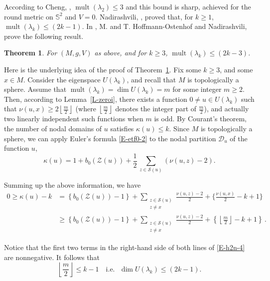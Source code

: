 \documentclass[12pt,a4paper]{amsart}
\theoremstyle{plain} %
\newtheorem{theorem}{Theorem}[section]
\theoremstyle{definition}
\numberwithin{equation}{section}
\numberwithin{figure}{section}
\numberwithin{table}{section}
\newcommand{\bS}{\mathbb{S}}
\newcommand{\cD}{\mathcal{D}}
\newcommand{\cS}{\mathcal{S}}
\newcommand{\cZ}{\mathcal{Z}}
\DeclareMathOperator{\mult}{mult}
\newcommand{\floor}[1]{\left\lfloor #1 \right\rfloor}
\begin{document}
According to  Cheng, \cite{Chen1976}, $\mult(\lambda_2) \le 3$ and this bound is sharp, achieved for the round metric on $\bS^2$ and $V=0$. Nadirashvili, \cite{Nadi1987}, proved that, for $ k \ge 1$, $\mult(\lambda_k) \le (2k-1)$. In \cite{HoHN1999}, M. and T. Hoffmann-Ostenhof and Nadirashvili, prove the following result.


\begin{theorem}\label{T-h2n}
For $(M,g,V)$ as above, and for $k \ge 3$, $\mult(\lambda_k) \le (2k-3)$.
\end{theorem}%

Here is the underlying idea of the proof of Theorem~\ref{T-h2n}.
Fix some $k \ge 3$, and some $x \in M$. Consider the eigenspace $U(\lambda_k)$, and recall that $M$ is topologically a sphere. \smallskip
Assume that $\mult(\lambda_k) = \dim U(\lambda_k) = m$ for some integer $m \ge 2$. Then, according to Lemma~\ref{L-zeroi}, there exists a function $0 \not = u \in U(\lambda_k)$ such that $\nu(u,x) \ge 2 \floor{\frac m2}$ (where $\floor{\frac m2}$ denotes the integer part of $\frac m2$), and actually two linearly independent such functions when $m$ is odd. By Courant's theorem, the number of nodal domains of $u$ satisfies $\kappa(u) \le k$. Since  $M$ is  topologically   a sphere, we can apply Euler's formula \eqref{E-etf0-2} to the nodal partition $\cD_{u}$ of the function $u$,
%
\begin{equation}\label{E-h2n-2}
\kappa(u) = 1 + b_0(\cZ(u)) + {\frac 12} \, \sum_{z \in \cS(u)} \left( \nu(u,z) - 2 \right).
\end{equation}

Summing up the above information, we have
%
\begin{equation}\label{E-h2n-4}
\begin{split}
0 \ge \kappa(u) - k & = \left\lbrace b_0(\cZ(u)) - 1\right\rbrace + \sum_{\substack{z \in \cS(u) \\z \not = x}} \frac{\nu(u,z) - 2}{2}
+ \lbrace \frac{\nu(u,x)}{2} - k + 1 \rbrace\\[5pt]
& \ge \left\lbrace b_0(\cZ(u)) - 1\right\rbrace + \sum_{\substack{z \in \cS(u) \\z \not = x}} \frac{\nu(u,z) - 2}{2}
+ \left\lbrace \floor{\frac m2} - k + 1 \right\rbrace\,.
\end{split}
\end{equation}

Notice that the first two terms in the right-hand side of both lines of \eqref{E-h2n-4} are nonnegative. It follows that
%
\begin{equation}\label{E-h2n-4a}
\floor{\frac m2} \le k - 1 \quad \text{i.e.~~} \dim U(\lambda_k) \le (2k-1).
\end{equation}
\end{document}
